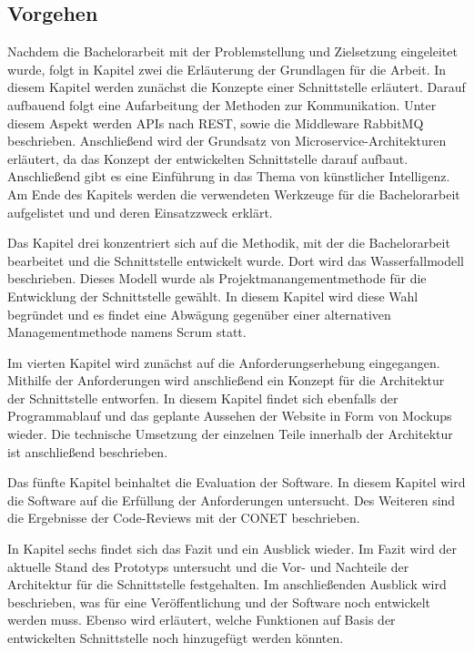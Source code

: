 \subsection{Vorgehen}
Nachdem die Bachelorarbeit mit der Problemstellung und Zielsetzung eingeleitet wurde, folgt in Kapitel zwei die Erläuterung der Grundlagen für die Arbeit. In diesem Kapitel werden zunächst die Konzepte einer Schnittstelle erläutert. Darauf aufbauend folgt eine Aufarbeitung der Methoden zur Kommunikation. Unter diesem Aspekt werden APIs nach REST, sowie die Middleware RabbitMQ beschrieben. Anschließend wird der Grundsatz von Microservice-Architekturen erläutert, da das Konzept der entwickelten Schnittstelle darauf aufbaut. Anschließend gibt es eine Einführung in das Thema von künstlicher Intelligenz. Am Ende des Kapitels werden die verwendeten Werkzeuge für die Bachelorarbeit aufgelistet und und deren Einsatzzweck erklärt.

Das Kapitel drei konzentriert sich auf die Methodik, mit der die Bachelorarbeit bearbeitet und die Schnittstelle entwickelt wurde. Dort wird das Wasserfallmodell beschrieben. Dieses Modell wurde als Projektmanangementmethode für die Entwicklung der Schnittstelle gewählt. In diesem Kapitel wird diese Wahl begründet und es findet eine Abwägung gegenüber einer alternativen Managementmethode namens \glqq Scrum\grqq{} statt.

Im vierten Kapitel wird zunächst auf die Anforderungserhebung eingegangen. Mithilfe der Anforderungen wird anschließend ein Konzept für die Architektur der Schnittstelle entworfen. In diesem Kapitel findet sich ebenfalls der Programmablauf und das geplante Aussehen der Website in Form von Mockups wieder. Die technische Umsetzung der einzelnen Teile innerhalb der Architektur ist anschließend beschrieben.

Das fünfte Kapitel beinhaltet die Evaluation der Software. In diesem Kapitel wird die Software auf die Erfüllung der Anforderungen untersucht. Des Weiteren sind die Ergebnisse der Code-Reviews mit der CONET beschrieben.

In Kapitel sechs findet sich das Fazit und ein Ausblick wieder. Im Fazit wird der aktuelle Stand des Prototyps untersucht und die Vor- und Nachteile der Architektur für die Schnittstelle festgehalten. Im anschließenden Ausblick wird beschrieben, was für eine Veröffentlichung und der Software noch entwickelt werden muss. Ebenso wird erläutert, welche Funktionen auf Basis der entwickelten Schnittstelle noch hinzugefügt werden könnten.